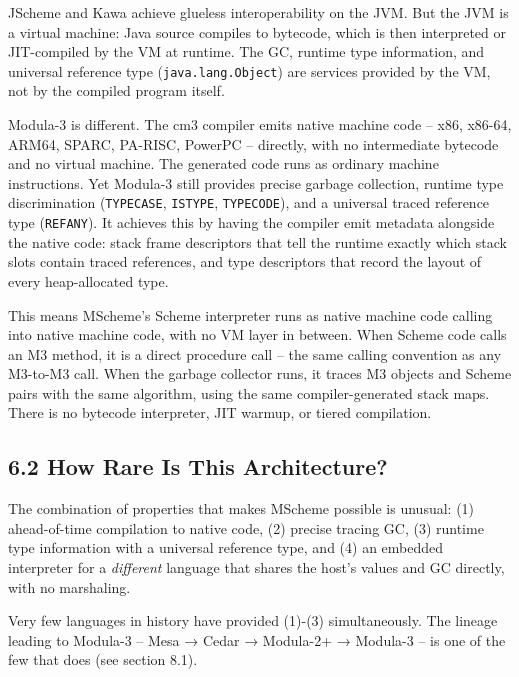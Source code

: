 \documentclass[
  12pt,
]{report}
\newcommand{\passthrough}[1]{#1}
\begin{document}
JScheme and Kawa achieve glueless interoperability on the JVM. But the
JVM is a virtual machine: Java source compiles to bytecode, which is
then interpreted or JIT-compiled by the VM at runtime. The GC, runtime
type information, and universal reference type
(\passthrough{\lstinline!java.lang.Object!}) are services provided by
the VM, not by the compiled program itself.

Modula-3 is different. The cm3 compiler emits native machine code --
x86, x86-64, ARM64, SPARC, PA-RISC, PowerPC -- directly, with no
intermediate bytecode and no virtual machine. The generated code runs as
ordinary machine instructions. Yet Modula-3 still provides precise
garbage collection, runtime type discrimination
(\passthrough{\lstinline!TYPECASE!}, \passthrough{\lstinline!ISTYPE!},
\passthrough{\lstinline!TYPECODE!}), and a universal traced reference
type (\passthrough{\lstinline!REFANY!}). It achieves this by having the
compiler emit metadata alongside the native code: stack frame
descriptors that tell the runtime exactly which stack slots contain
traced references, and type descriptors that record the layout of every
heap-allocated type.

This means MScheme's Scheme interpreter runs as native machine code
calling into native machine code, with no VM layer in between. When
Scheme code calls an M3 method, it is a direct procedure call -- the
same calling convention as any M3-to-M3 call. When the garbage collector
runs, it traces M3 objects and Scheme pairs with the same algorithm,
using the same compiler-generated stack maps. There is no bytecode
interpreter, JIT warmup, or tiered compilation.

\subsection{6.2 How Rare Is This
Architecture?}\label{how-rare-is-this-architecture}

The combination of properties that makes MScheme possible is unusual:
(1) ahead-of-time compilation to native code, (2) precise tracing GC,
(3) runtime type information with a universal reference type, and (4) an
embedded interpreter for a \emph{different} language that shares the
host's values and GC directly, with no marshaling.

Very few languages in history have provided (1)-(3) simultaneously. The
lineage leading to Modula-3 -- Mesa → Cedar → Modula-2+ → Modula-3 -- is
one of the few that does (see section 8.1).
\end{document}
